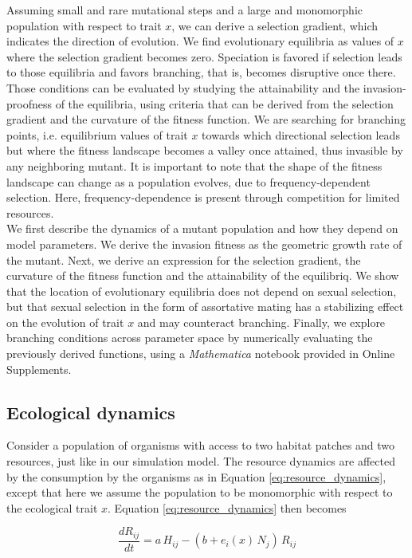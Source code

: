 Assuming small and rare mutational steps and a large and monomorphic population with respect to trait $x$, we can derive a selection gradient, which indicates the direction of evolution. We find evolutionary equilibria as values of $x$ where the selection gradient becomes zero. Speciation is favored if selection leads to those equilibria and favors branching, that is, becomes disruptive once there. Those conditions can be evaluated by studying the attainability and the invasion-proofness of the equilibria, using criteria that can be derived from the selection gradient and the curvature of the fitness function. We are searching for branching points, i.e. equilibrium values of trait $x$ towards which directional selection leads but where the fitness landscape becomes a valley once attained, thus invasible by any neighboring mutant. It is important to note that the shape of the fitness landscape can change as a population evolves, due to frequency-dependent selection. Here, frequency-dependence is present through competition for limited resources.\\

We first describe the dynamics of a mutant population and how they depend on model parameters. We derive the invasion fitness as the geometric growth rate of the mutant. Next, we derive an expression for the selection gradient, the curvature of the fitness function and the attainability of the equilibriq. We show that the location of evolutionary equilibria does not depend on sexual selection, but that sexual selection in the form of assortative mating has a stabilizing effect on the evolution of trait $x$ and may counteract branching. Finally, we explore branching conditions across parameter space by numerically evaluating the previously derived functions, using a \textit{Mathematica} notebook provided in Online Supplements.

\subsection*{Ecological dynamics}

Consider a population of organisms with access to two habitat patches and two resources, just like in our simulation model. The resource dynamics are affected by the consumption by the organisms as in Equation \ref{eq:resource_dynamics}, except that here we assume the population to be monomorphic with respect to the ecological trait $x$. Equation \ref{eq:resource_dynamics} then becomes

\begin{equation}
    \frac{dR_{ij}}{dt} = a \, H_{ij} - (b + e_i(x)\, N_j ) \, R_{ij}
\end{equation}

